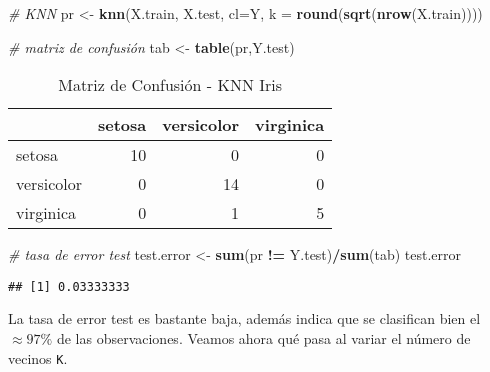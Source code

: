 \documentclass[]{book}
\newenvironment{Shaded}{\begin{snugshade}}{\end{snugshade}}
\newcommand{\CommentTok}[1]{\textcolor[rgb]{0.56,0.35,0.01}{\textit{#1}}}
\newcommand{\DataTypeTok}[1]{\textcolor[rgb]{0.13,0.29,0.53}{#1}}
\newcommand{\KeywordTok}[1]{\textcolor[rgb]{0.13,0.29,0.53}{\textbf{#1}}}
\newcommand{\NormalTok}[1]{#1}
\newcommand{\OperatorTok}[1]{\textcolor[rgb]{0.81,0.36,0.00}{\textbf{#1}}}
\newcommand{\StringTok}[1]{\textcolor[rgb]{0.31,0.60,0.02}{#1}}
\begin{document}
\begin{Shaded}
\begin{Highlighting}[]
\CommentTok{# KNN }
\NormalTok{pr <-}\StringTok{ }\KeywordTok{knn}\NormalTok{(X.train, X.test, }\DataTypeTok{cl=}\NormalTok{Y, }\DataTypeTok{k =} \KeywordTok{round}\NormalTok{(}\KeywordTok{sqrt}\NormalTok{(}\KeywordTok{nrow}\NormalTok{(X.train))))}

\CommentTok{# matriz de confusión}
\NormalTok{tab <-}\StringTok{ }\KeywordTok{table}\NormalTok{(pr,Y.test)}
\end{Highlighting}
\end{Shaded}

\begin{table}

\caption{\label{tab:confIris-tab}Matriz de Confusión - KNN Iris}
\centering
\begin{tabular}[t]{lrrr}
\toprule
  & setosa & versicolor & virginica\\
\midrule
setosa & 10 & 0 & 0\\
versicolor & 0 & 14 & 0\\
virginica & 0 & 1 & 5\\
\bottomrule
\end{tabular}
\end{table}

\begin{Shaded}
\begin{Highlighting}[]
\CommentTok{# tasa de error test}
\NormalTok{test.error <-}\StringTok{ }\KeywordTok{sum}\NormalTok{(pr }\OperatorTok{!=}\StringTok{ }\NormalTok{Y.test)}\OperatorTok{/}\KeywordTok{sum}\NormalTok{(tab)}
\NormalTok{test.error}
\end{Highlighting}
\end{Shaded}

\begin{verbatim}
## [1] 0.03333333
\end{verbatim}

La tasa de error test es bastante baja, además indica que se clasifican bien el \(\approx 97\%\) de las observaciones. Veamos ahora qué pasa al variar el número de vecinos \texttt{K}.
\end{document}
